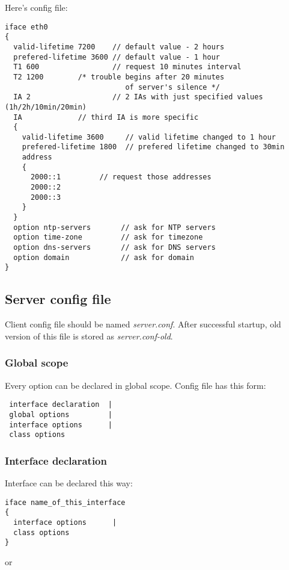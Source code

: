 Here's config file:

\begin{verbatim}
iface eth0
{
  valid-lifetime 7200    // default value - 2 hours
  prefered-lifetime 3600 // default value - 1 hour
  T1 600                 // request 10 minutes interval
  T2 1200		 /* trouble begins after 20 minutes
                            of server's silence */
  IA 2                   // 2 IAs with just specified values (1h/2h/10min/20min)
  IA			 // third IA is more specific
  {
    valid-lifetime 3600   	// valid lifetime changed to 1 hour
    prefered-lifetime 1800	// prefered lifetime changed to 30min
    address
    {			  
      2000::1		  // request those addresses
      2000::2             
      2000::3
    }
  }
  option ntp-servers       // ask for NTP servers
  option time-zone         // ask for timezone
  option dns-servers       // ask for DNS servers
  option domain            // ask for domain
}
\end{verbatim}

\subsection{Server config file}

Client config file should be named \emph{server.conf}. After
successful startup, old version of this file is stored as \emph{server.conf-old}.

\subsubsection{Global scope}

Every option can be declared in global scope.
Config file has this form:

\begin{verbatim}
 interface declaration	|
 global options         |
 interface options      |
 class options          
\end{verbatim}

\subsubsection{Interface declaration}

Interface can be declared this way:
\begin{verbatim}
iface name_of_this_interface
{
  interface options      |
  class options        
}
\end{verbatim}

or 

